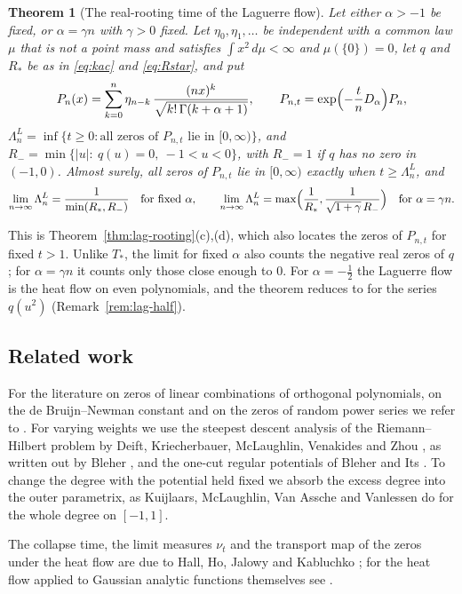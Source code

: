 \documentclass[11pt]{amsart}
\newtheorem{theorem}{Theorem}[section]
\theoremstyle{definition}
\theoremstyle{remark}
\numberwithin{equation}{section}
\begin{document}
\begin{theorem}[The real-rooting time of the Laguerre flow]\label{thm:lag-intro}
Let either $\alpha>-1$ be fixed, or $\alpha=\gamma n$ with $\gamma>0$ fixed. Let $\eta_0,\eta_1,\dots$ be independent with a common law $\mu$ that is not a point mass and satisfies $\int x^2\,d\mu<\infty$ and $\mu(\{0\})=0$, let $q$ and $R_*$ be as in \eqref{eq:kac} and \eqref{eq:Rstar}, and put
\[
P_n(x)=\sum_{k=0}^{n}\eta_{n-k}\,\frac{(nx)^k}{\sqrt{k!\,\Gamma(k+\alpha+1)}},\qquad P_{n,t}=\exp\Bigl(-\frac tnD_\alpha\Bigr)P_n,
\]
$\Lambda^L_n=\inf\{t\ge0:\text{all zeros of }P_{n,t}\text{ lie in }[0,\infty)\}$, and $R_-=\min\{|u|:\ q(u)=0,\ -1<u<0\}$, with $R_-=1$ if $q$ has no zero in $(-1,0)$. Almost surely, all zeros of $P_{n,t}$ lie in $[0,\infty)$ exactly when $t\ge\Lambda^L_n$, and
\[
\lim_{n\to\infty}\Lambda^L_n=\frac1{\min(R_*,R_-)}\quad\text{for fixed }\alpha,\qquad\lim_{n\to\infty}\Lambda^L_n=\max\Bigl(\frac1{R_*},\frac1{\sqrt{1+\gamma}\,R_-}\Bigr)\quad\text{for }\alpha=\gamma n.
\]
\end{theorem}

This is Theorem~\ref{thm:lag-rooting}(c),(d), which also locates the zeros of $P_{n,t}$ for fixed $t>1$. Unlike $T_*$, the limit for fixed $\alpha$ also counts the negative real zeros of $q$; for $\alpha=\gamma n$ it counts only those close enough to $0$. For $\alpha=-\frac12$ the Laguerre flow is the heat flow on even polynomials, and the theorem reduces to \cite[Theorem~\ref{M-thm:fixedq}]{Main} for the series $q(u^2)$ (Remark~\ref{rem:lag-half}).

\subsection{Related work}\label{subsec:related}
For the literature on zeros of linear combinations of orthogonal polynomials, on the de Bruijn--Newman constant and on the zeros of random power series we refer to \cite{Main}. For varying weights we use the steepest descent analysis of the Riemann--Hilbert problem by Deift, Kriecherbauer, McLaughlin, Venakides and Zhou \cite{DKMVZ}, as written out by Bleher \cite{Bl}, and the one-cut regular potentials of Bleher and Its \cite{BI}. To change the degree with the potential held fixed we absorb the excess degree into the outer parametrix, as Kuijlaars, McLaughlin, Van Assche and Vanlessen \cite{KMVV} do for the whole degree on $[-1,1]$.

The collapse time, the limit measures $\nu_t$ and the transport map of the zeros under the heat flow are due to Hall, Ho, Jalowy and Kabluchko \cite{HHJK}; for the heat flow applied to Gaussian analytic functions themselves see \cite{HHJK2}.
\end{document}
